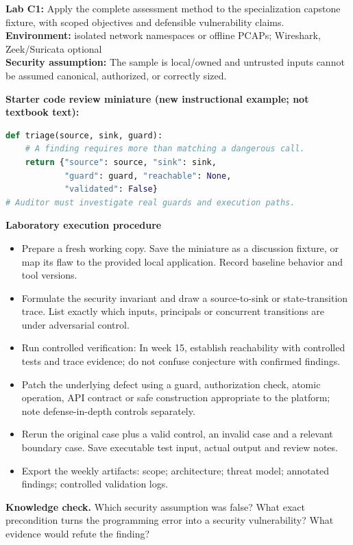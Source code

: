 \documentclass[10pt,letterpaper]{article}
\begin{document}
\begin{insight}\textbf{Lab C1:} Apply the complete assessment method to the specialization capstone fixture, with scoped objectives and defensible vulnerability claims.\\\textbf{Environment:} isolated network namespaces or offline PCAPs; Wireshark, Zeek/Suricata optional\\\textbf{Security assumption:} The sample is local/owned and untrusted inputs cannot be assumed canonical, authorized, or correctly sized.\end{insight}
\textbf{Starter code review miniature (new instructional example; not textbook text):}
\begin{lstlisting}[language=Python]
def triage(source, sink, guard):
    # A finding requires more than matching a dangerous call.
    return {"source": source, "sink": sink,
            "guard": guard, "reachable": None,
            "validated": False}
# Auditor must investigate real guards and execution paths.
\end{lstlisting}
\textbf{Laboratory execution procedure}
\begin{itemize}[leftmargin=*,itemsep=2pt]
\item Prepare a fresh working copy. Save the miniature as a discussion fixture, or map its flaw to the provided local application. Record baseline behavior and tool versions.
\item Formulate the security invariant and draw a source-to-sink or state-transition trace. List exactly which inputs, principals or concurrent transitions are under adversarial control.
\item Run controlled verification: In week 15, establish reachability with controlled tests and trace evidence; do not confuse conjecture with confirmed findings.
\item Patch the underlying defect using a guard, authorization check, atomic operation, API contract or safe construction appropriate to the platform; note defense-in-depth controls separately.
\item Rerun the original case plus a valid control, an invalid case and a relevant boundary case. Save executable test input, actual output and review notes.
\item Export the weekly artifacts: scope; architecture; threat model; annotated findings; controlled validation logs.
\end{itemize}
\textbf{Knowledge check.} Which security assumption was false? What exact precondition turns the programming error into a security vulnerability? What evidence would refute the finding?
\end{document}
